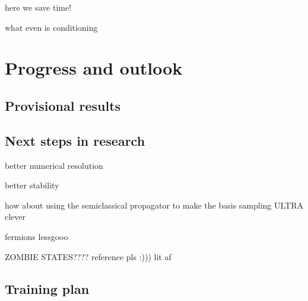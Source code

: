 \documentclass[12pt]{article}
\begin{document}
	here we save time!
	
	what even is conditioning
	
	
	
	\section{Progress and outlook}
	
	\subsection{Provisional results}
	
	\subsection{Next steps in research}
	better numerical resolution
	
	better stability
	
	how about using the semiclassical propagator to make the basis sampling ULTRA clever
	
	fermions lessgooo
	
	ZOMBIE STATES???? reference pls :))) lit af
	
	\subsection{Training plan}
	
	
	
\end{document}
